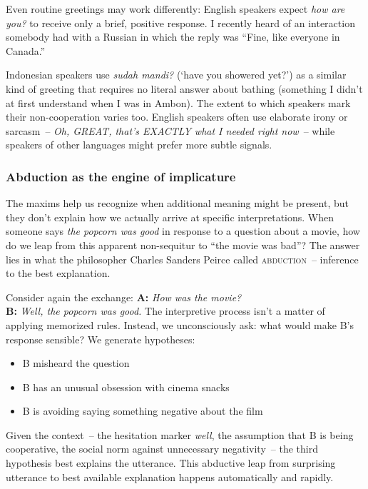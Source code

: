 Even routine greetings may work differently: English speakers expect \textit{how are you?} to receive only a brief, positive response. I recently heard of an interaction somebody had with a Russian in which the reply was ``Fine, like everyone in Canada.''

Indonesian speakers use \textit{sudah mandi?} (`have you showered yet?') as a similar kind of greeting that requires no literal answer about bathing (something I didn't at first understand when I was in Ambon). The extent to which speakers mark their non-cooperation varies too. English speakers often use elaborate irony or sarcasm~-- \textit{Oh, GREAT, that's EXACTLY what I needed right now}~-- while speakers of other languages might prefer more subtle signals.

\subsubsection{Abduction as the engine of implicature}\label{sec:abduction-implicature}

The maxims help us recognize when additional meaning might be present, but they don't explain how we actually arrive at specific interpretations. When someone says \textit{the popcorn was good} in response to a question about a movie, how do we leap from this apparent non-sequitur to ``the movie was bad''? The answer lies in what the philosopher Charles Sanders Peirce called \textsc{abduction}~-- inference to the best explanation.

Consider again the exchange:
\ea
   \textbf{A:} \textit{How was the movie?}\\
   \textbf{B:} \textit{Well, the popcorn was good.}
\z
The interpretive process isn't a matter of applying memorized rules. Instead, we unconsciously ask: what would make B's response sensible? We generate hypotheses:
\begin{itemize}[noitemsep]
   \item B misheard the question
   \item B has an unusual obsession with cinema snacks
   \item B is avoiding saying something negative about the film
\end{itemize}

Given the context~-- the hesitation marker \textit{well}, the assumption that B is being cooperative, the social norm against unnecessary negativity~-- the third hypothesis best explains the utterance. This abductive leap from surprising utterance to best available explanation happens automatically and rapidly.

